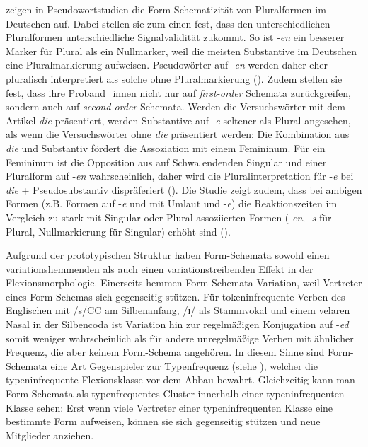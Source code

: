   \textcite{Kopcke.2021} zeigen in Pseudowortstudien die Form-Schematizität von Pluralformen im Deutschen auf. Dabei stellen sie zum einen fest, dass den unterschiedlichen Pluralformen unterschiedliche Signalvalidität zukommt. So ist -\textit{en} ein besserer Marker für Plural als ein Nullmarker, weil die meisten Substantive im Deutschen eine Pluralmarkierung aufweisen. Pseudowörter auf -\textit{en} werden daher eher pluralisch interpretiert als solche ohne Pluralmarkierung (\cite[10--19]{Kopcke.2021}). Zudem stellen sie fest, dass ihre Proband\_innen nicht nur auf \textit{first-order} Schemata zurückgreifen, sondern auch auf \textit{second-order} Schemata. Werden die Versuchswörter mit dem Artikel \textit{die} präsentiert, werden Substantive auf -\textit{e} seltener als Plural angesehen, als wenn die Versuchswörter ohne \textit{die} präsentiert werden: Die Kombination aus \textit{die} und Substantiv fördert die Assoziation mit einem Femininum. Für ein Femininum ist die Opposition aus auf Schwa endenden Singular und einer Pluralform auf -\textit{en} wahrscheinlich, daher wird die Pluralinterpretation für -\textit{e} bei \textit{die} + Pseudosubstantiv dispräferiert (\cite[18]{Kopcke.2021}). Die Studie zeigt zudem, dass bei ambigen Formen (z.B. Formen auf -\textit{e} und mit Umlaut und -\textit{e}) die Reaktionszeiten im Vergleich zu stark mit Singular oder Plural assoziierten Formen (-\textit{en}, -\textit{s} für Plural, Nullmarkierung für Singular) erhöht sind (\cite[19]{Kopcke.2021}).   

Aufgrund der prototypischen Struktur haben Form-Schemata sowohl einen variationshemmenden als auch einen variationstreibenden Effekt in der Flexionsmorphologie. Einerseits hemmen Form-Schemata Variation, weil Vertreter eines Form-Schemas sich gegenseitig stützen. Für tokeninfrequente Verben des Englischen mit /s/CC am Silbenanfang, /ɪ/ als Stammvokal und einem velaren Nasal in der Silbencoda ist Variation hin zur regelmäßigen Konjugation auf -\textit{ed} somit weniger wahrscheinlich als für andere unregelmäßige Verben mit ähnlicher Frequenz, die aber keinem Form-Schema angehören. In diesem Sinne sind Form-Schemata eine Art Gegenspieler zur Typenfrequenz (siehe ), welcher die typeninfrequente Flexionsklasse vor dem Abbau bewahrt. Gleichzeitig kann man Form-Schemata als typenfrequentes Cluster innerhalb einer typeninfrequenten Klasse sehen: Erst wenn viele Vertreter einer typeninfrequenten Klasse eine bestimmte Form aufweisen, können sie sich gegenseitig stützen und neue Mitglieder anziehen.

